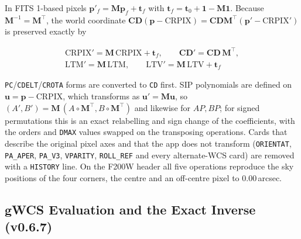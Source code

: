 \documentclass[11pt,a4paper]{article}
\newcommand{\code}[1]{\texttt{\small #1}}
\newcommand{\mat}[1]{\mathbf{#1}}
\begin{document}
    In FITS 1-based pixels $\mathbf{p}'_f = \mat{M}\mathbf{p}_f + \mathbf{t}_f$ with $\mathbf{t}_f = \mathbf{t}_0 + \mathbf{1} - \mat{M}\mathbf{1}$. Because $\mat{M}^{-1} = \mat{M}^{\top}$, the world coordinate $\mat{CD}(\mathbf{p} - \text{CRPIX}) = \mat{CD}\mat{M}^{\top}(\mathbf{p}' - \text{CRPIX}')$ is preserved exactly by

    \begin{equation}
        \boxed{
            \begin{gathered}
            \text{CRPIX}' = \mat{M}\,\text{CRPIX} + \mathbf{t}_f, \qquad
            \mat{CD}' = \mat{CD}\,\mat{M}^{\top}, \\
            \text{LTM}' = \mat{M}\,\text{LTM}, \qquad
            \text{LTV}' = \mat{M}\,\text{LTV} + \mathbf{t}_f
            \end{gathered}
        }
    \end{equation}

    \code{PC}/\code{CDELT}/\code{CROTA} forms are converted to \code{CD} first. SIP polynomials are defined on $\mathbf{u} = \mathbf{p} - \text{CRPIX}$, which transforms as $\mathbf{u}' = \mat{M}\mathbf{u}$, so $(A', B') = \mat{M}\,(A \circ \mat{M}^{\top}, B \circ \mat{M}^{\top})$ and likewise for $AP, BP$; for signed permutations this is an exact relabelling and sign change of the coefficients, with the orders and \code{DMAX} values swapped on the transposing operations. Cards that describe the original pixel axes and that the app does not transform (\code{ORIENTAT}, \code{PA\_APER}, \code{PA\_V3}, \code{VPARITY}, \code{ROLL\_REF} and every alternate-WCS card) are removed with a \code{HISTORY} line. On the F200W header all five operations reproduce the sky positions of the four corners, the centre and an off-centre pixel to 0.00\,arcsec.

    \subsection{gWCS Evaluation and the Exact Inverse (v0.6.7)}
    \label{sec:gwcs_math}
\end{document}
